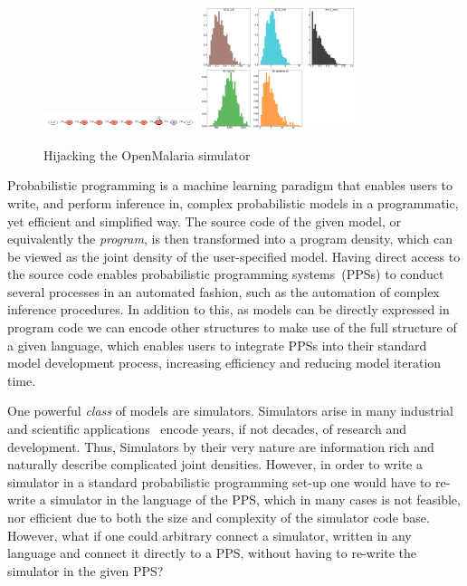 \documentclass{article}
\begin{document}
\begin{figure}
\centering
\includegraphics[width=0.40\textwidth]{../plots/model_lambda/model_posterior.pdf}
\includegraphics[width=0.40\textwidth]{../plots/model_lambda/hist_posteriors.png}
\caption{Hijacking the OpenMalaria simulator}
\label{fig:hijacking} 
\end{figure}

Probabilistic programming\cite{gordon2014probabilistic,le2016inference} is a machine learning paradigm that enables users to write, and perform inference in, complex probabilistic models in a programmatic, yet efficient and simplified way. 
The source code of the given model, or equivalently the \emph{program}, is then transformed into a program density, which can
be viewed as the joint density of the user-specified model.
Having direct access to the source code enables probabilistic programming systems~(PPSs)
to conduct several processes in an automated fashion, such as 
the automation of complex inference procedures\cite{zhou2019lf,goodman2012church,wood2014new}.
In addition to this, as models can be directly expressed in program code we can encode other structures to make use of the full structure of a given language,
which enables users to integrate PPSs into their standard model development process, increasing efficiency and reducing model iteration time.


One powerful \emph{class} of models are simulators. 
Simulators arise in many industrial \cite{di2015simulator,judd2009numerically,kass1990rapid} and scientific applications~\cite{smith2008towards,bershteyn2018implementation,gleisberg_event_2008} encode years, if not decades, of research and development.
Thus, Simulators by their very nature are
information rich and naturally describe complicated joint densities.
However, in order to write a simulator in a standard probabilistic programming set-up one would have to re-write a simulator in the language of the PPS, which 
in many cases is not feasible, nor efficient due to both the size 
and complexity of the simulator code base. 
However, what if one could arbitrary connect a simulator, written in any
language and connect it directly to a PPS, without having to re-write
the simulator in the given PPS?
\end{document}
